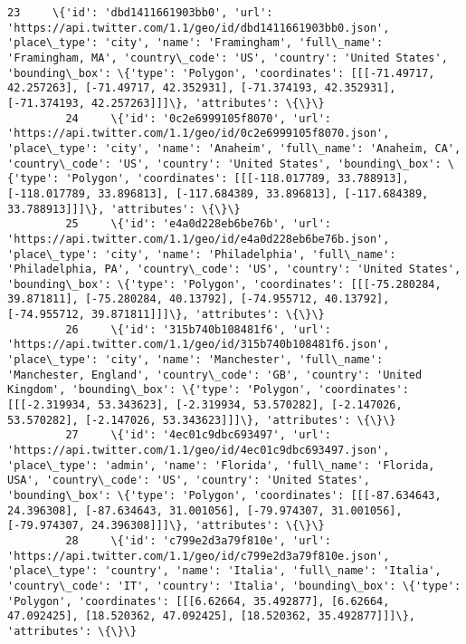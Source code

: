 \documentclass[11pt]{article}
\begin{document}
\begin{Verbatim}[commandchars=\\\{\}]
         23     \{'id': 'dbd1411661903bb0', 'url': 'https://api.twitter.com/1.1/geo/id/dbd1411661903bb0.json', 'place\_type': 'city', 'name': 'Framingham', 'full\_name': 'Framingham, MA', 'country\_code': 'US', 'country': 'United States', 'bounding\_box': \{'type': 'Polygon', 'coordinates': [[[-71.49717, 42.257263], [-71.49717, 42.352931], [-71.374193, 42.352931], [-71.374193, 42.257263]]]\}, 'attributes': \{\}\}                     
         24     \{'id': '0c2e6999105f8070', 'url': 'https://api.twitter.com/1.1/geo/id/0c2e6999105f8070.json', 'place\_type': 'city', 'name': 'Anaheim', 'full\_name': 'Anaheim, CA', 'country\_code': 'US', 'country': 'United States', 'bounding\_box': \{'type': 'Polygon', 'coordinates': [[[-118.017789, 33.788913], [-118.017789, 33.896813], [-117.684389, 33.896813], [-117.684389, 33.788913]]]\}, 'attributes': \{\}\}                     
         25     \{'id': 'e4a0d228eb6be76b', 'url': 'https://api.twitter.com/1.1/geo/id/e4a0d228eb6be76b.json', 'place\_type': 'city', 'name': 'Philadelphia', 'full\_name': 'Philadelphia, PA', 'country\_code': 'US', 'country': 'United States', 'bounding\_box': \{'type': 'Polygon', 'coordinates': [[[-75.280284, 39.871811], [-75.280284, 40.13792], [-74.955712, 40.13792], [-74.955712, 39.871811]]]\}, 'attributes': \{\}\}                 
         26     \{'id': '315b740b108481f6', 'url': 'https://api.twitter.com/1.1/geo/id/315b740b108481f6.json', 'place\_type': 'city', 'name': 'Manchester', 'full\_name': 'Manchester, England', 'country\_code': 'GB', 'country': 'United Kingdom', 'bounding\_box': \{'type': 'Polygon', 'coordinates': [[[-2.319934, 53.343623], [-2.319934, 53.570282], [-2.147026, 53.570282], [-2.147026, 53.343623]]]\}, 'attributes': \{\}\}                 
         27     \{'id': '4ec01c9dbc693497', 'url': 'https://api.twitter.com/1.1/geo/id/4ec01c9dbc693497.json', 'place\_type': 'admin', 'name': 'Florida', 'full\_name': 'Florida, USA', 'country\_code': 'US', 'country': 'United States', 'bounding\_box': \{'type': 'Polygon', 'coordinates': [[[-87.634643, 24.396308], [-87.634643, 31.001056], [-79.974307, 31.001056], [-79.974307, 24.396308]]]\}, 'attributes': \{\}\}                       
         28     \{'id': 'c799e2d3a79f810e', 'url': 'https://api.twitter.com/1.1/geo/id/c799e2d3a79f810e.json', 'place\_type': 'country', 'name': 'Italia', 'full\_name': 'Italia', 'country\_code': 'IT', 'country': 'Italia', 'bounding\_box': \{'type': 'Polygon', 'coordinates': [[[6.62664, 35.492877], [6.62664, 47.092425], [18.520362, 47.092425], [18.520362, 35.492877]]]\}, 'attributes': \{\}\}                                           

\end{Verbatim}
\end{document}
